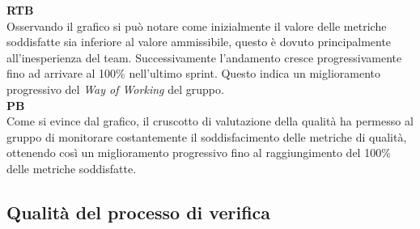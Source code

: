 \begin{flushleft}
\textbf{RTB} \\
Osservando il grafico si può notare come inizialmente il valore delle metriche soddisfatte sia inferiore al valore ammissibile, questo è dovuto principalmente all'inesperienza del team. Successivamente l'andamento cresce progressivamente fino ad arrivare al 100\% nell'ultimo sprint. Questo indica un miglioramento progressivo del \textit{Way of Working} del gruppo. \\
\textbf{PB} \\
Come si evince dal grafico, il cruscotto di valutazione della qualità ha permesso al gruppo di monitorare costantemente il soddisfacimento delle metriche di qualità, ottenendo così un miglioramento progressivo fino al raggiungimento del 100\% delle metriche soddisfatte.
\end{flushleft}

\newpage
\subsection{Qualità del processo di verifica}
